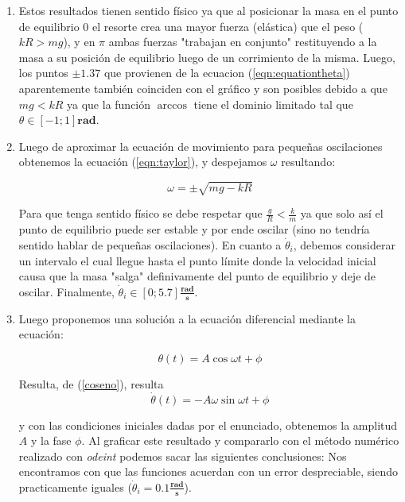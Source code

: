 \documentclass{article}
\begin{document}
	\begin{enumerate}
		\item Estos resultados tienen sentido f\'isico ya que al posicionar la masa en el punto de equilibrio 0 el resorte crea una mayor fuerza (el\'astica) que el peso ($kR > mg$), y en $\pi$ ambas fuerzas "trabajan en conjunto" restituyendo a la masa a su posici\'on de equilibrio luego de un corrimiento de la misma. Luego, los puntos $\pm 1.37$ que provienen de la ecuacion (\ref{eqn:equationtheta}) aparentemente tambi\'en coinciden con el gr\'afico y son posibles debido a que $mg<kR$ ya que la funci\'on $\arccos{}$ tiene el dominio limitado tal que $\theta \in [-1;1] \textbf{rad}$.
		
		\item Luego de aproximar la ecuaci\'on de movimiento para peque\~nas oscilaciones obtenemos la ecuaci\'on (\ref{eqn:taylor}), y despejamos $\omega$ resultando:
		
		\begin{equation}
		\label{omega}
			\omega = \pm\sqrt{mg - kR}
		\end{equation}
		
		Para que tenga sentido f\'isico se debe respetar que $\frac{g}{R} < \frac{k}{m}$ ya que solo as\'i el punto de equilibrio puede ser estable y por ende oscilar (sino no tendr\'ia sentido hablar de peque\~nas oscilaciones). En cuanto a $\dot{\theta}_i$, debemos considerar un intervalo el cual llegue hasta el punto l\'imite donde la velocidad inicial causa que la masa "salga" definivamente del punto de equilibrio y deje de oscilar. Finalmente, $\dot{\theta}_i \in [0;5.7] \frac{\textbf{rad}}{\textbf{s}}$.
		
		\item Luego proponemos una soluci\'on a la ecuaci\'on diferencial mediante la ecuaci\'on:
		
		\begin{equation}
		\label{coseno}
			\theta(t) = A \cos{\omega t + \phi}
		\end{equation}
		
		Resulta, de (\ref{coseno}), resulta
			$$\dot{\theta}(t) = -A \omega \sin{\omega t + \phi}$$
			
		y con las condiciones iniciales dadas por el enunciado, obtenemos la amplitud $A$ y la fase $\phi$. Al graficar este resultado y compararlo con el m\'etodo num\'erico realizado con \emph{odeint} podemos sacar las siguientes conclusiones: Nos encontramos con que las funciones acuerdan con un error despreciable, siendo practicamente iguales ($\dot{\theta}_i = 0.1 \frac{\textbf{rad}}{\textbf{s}}$).
		

\end{enumerate}
\end{document}
